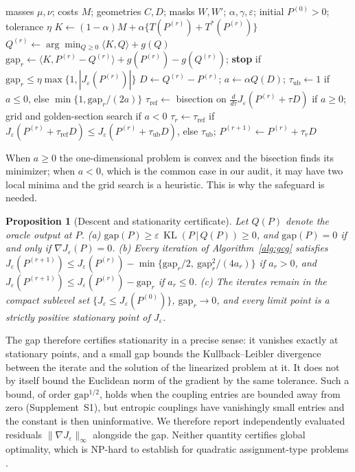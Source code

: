 \documentclass[12pt]{article}
\newtheorem{proposition}{Proposition}
\theoremstyle{definition}
\newcommand{\KL}{\operatorname{KL}}
\begin{document}
\begin{algorithm}[t]
\caption{Generalized conditional gradient with safeguarded step for $J_\varepsilon$}\label{alg:gcg}
\begin{algorithmic}[1]
\Require masses $\mu,\nu$; costs $M$; geometries $C,D$; masks $W,W'$; $\alpha,\gamma,\varepsilon$; initial $P^{(0)}>0$; tolerance $\eta$
\State $K\gets(1-\alpha)M+\alpha\{T(P^{(r)})+T^\ast(P^{(r)})\}$ 
\State $Q^{(r)}\gets\arg\min_{Q\ge0}\langle K,Q\rangle+g(Q)$ 
\State $\mathrm{gap}_r\gets\langle K,P^{(r)}-Q^{(r)}\rangle+g(P^{(r)})-g(Q^{(r)})$; \textbf{stop} if $\mathrm{gap}_r\le\eta\max\{1,|J_\varepsilon(P^{(r)})|\}$
\State $D\gets Q^{(r)}-P^{(r)}$;\; $a\gets\alpha Q(D)$;\; $\tau_{\mathrm{ub}}\gets1$ if $a\le0$, else $\min\{1,\mathrm{gap}_r/(2a)\}$
\State $\tau_{\mathrm{ref}}\gets$ bisection on $\tfrac{d}{d\tau}J_\varepsilon(P^{(r)}+\tau D)$ if $a\ge0$; grid and golden-section search if $a<0$
\State $\tau_r\gets\tau_{\mathrm{ref}}$ if $J_\varepsilon(P^{(r)}+\tau_{\mathrm{ref}}D)\le J_\varepsilon(P^{(r)}+\tau_{\mathrm{ub}}D)$, else $\tau_{\mathrm{ub}}$;\; $P^{(r+1)}\gets P^{(r)}+\tau_rD$
\EndFor
\end{algorithmic}
\end{algorithm}

When $a\ge0$ the one-dimensional problem is convex and the bisection finds its minimizer; when $a<0$, which is the common case in our audit, it may have two local minima and the grid search is a heuristic. This is why the safeguard is needed.

\begin{proposition}[Descent and stationarity certificate]\label{prop:gcg}
Let $Q(P)$ denote the oracle output at $P$. (a) $\mathrm{gap}(P)\ge\varepsilon\,\KL(P\,|\,Q(P))\ge0$, and $\mathrm{gap}(P)=0$ if and only if $\nabla J_\varepsilon(P)=0$. (b) Every iteration of Algorithm~\ref{alg:gcg} satisfies $J_\varepsilon(P^{(r+1)})\le J_\varepsilon(P^{(r)})-\min\{\mathrm{gap}_r/2,\ \mathrm{gap}_r^2/(4a_r)\}$ if $a_r>0$, and $J_\varepsilon(P^{(r+1)})\le J_\varepsilon(P^{(r)})-\mathrm{gap}_r$ if $a_r\le0$. (c) The iterates remain in the compact sublevel set $\{J_\varepsilon\le J_\varepsilon(P^{(0)})\}$, $\mathrm{gap}_r\to0$, and every limit point is a strictly positive stationary point of $J_\varepsilon$.
\end{proposition}

The gap therefore certifies stationarity in a precise sense: it vanishes exactly at stationary points, and a small gap bounds the Kullback--Leibler divergence between the iterate and the solution of the linearized problem at it. It does not by itself bound the Euclidean norm of the gradient by the same tolerance. Such a bound, of order $\mathrm{gap}^{1/2}$, holds when the coupling entries are bounded away from zero (Supplement~S1), but entropic couplings have vanishingly small entries and the constant is then uninformative. We therefore report independently evaluated residuals $\|\nabla J_\varepsilon\|_\infty$ alongside the gap. Neither quantity certifies global optimality, which is NP-hard to establish for quadratic assignment-type problems \citep{burkard1998quadratic}.
\end{document}
